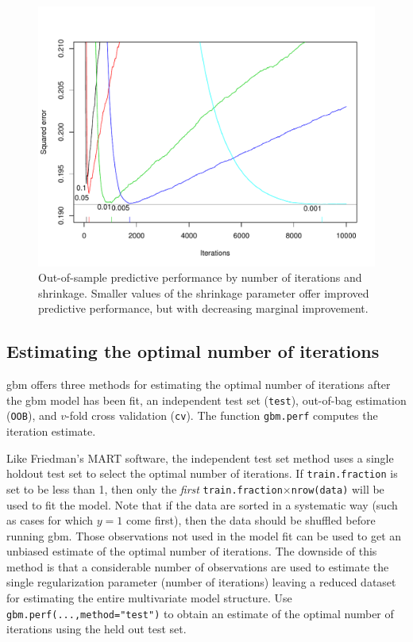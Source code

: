 \documentclass{article}
\begin{document}
\begin{figure}[ht]
\begin{center}
\includegraphics[width=5in]{shrinkage-v-iterations}
\end{center}
\caption{Out-of-sample predictive performance by number of iterations and shrinkage. Smaller values of the shrinkage parameter offer improved predictive performance, but with decreasing marginal improvement.}
\label{fig:shrinkViters}
\end{figure}

\subsection{Estimating the optimal number of iterations}
gbm offers three methods for estimating the optimal number of iterations after the gbm model has been fit, an independent test set (\texttt{test}), out-of-bag estimation (\texttt{OOB}), and $v$-fold cross validation (\texttt{cv}). The function \texttt{gbm.perf} computes the iteration estimate.

Like Friedman's MART software, the independent test set method uses a single holdout test set to select the optimal number of iterations. If \texttt{train.fraction} is set to be less than 1, then only the \textit{first} \texttt{train.fraction}$\times$\texttt{nrow(data)} will be used to fit the model. Note that if the data are sorted in a systematic way (such as cases for which $y=1$ come first), then the data should be shuffled before running gbm. Those observations not used in the model fit can be used to get an unbiased estimate of the optimal number of iterations. The downside of this method is that a considerable number of observations are used to estimate the single regularization parameter (number of iterations) leaving a reduced dataset for estimating the entire multivariate model structure. Use \texttt{gbm.perf(...,method="test")} to obtain an estimate of the optimal number of iterations using the held out test set.
\end{document}

